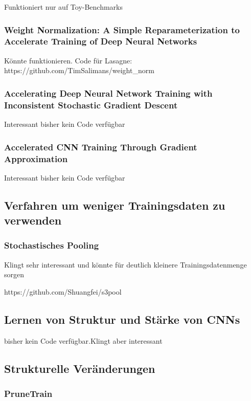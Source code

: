 Funktioniert nur auf Toy-Benchmarks


\subsubsection{Weight Normalization: A Simple Reparameterization
to Accelerate Training of Deep Neural Networks}


Könnte funktionieren. Code für Lasagne: https://github.com/TimSalimans/weight\_norm


\subsubsection{Accelerating Deep Neural Network Training with Inconsistent Stochastic Gradient Descent}

Interessant bisher kein Code verfügbar


\subsubsection{Accelerated CNN Training Through Gradient Approximation }

Interessant bisher kein Code verfügbar




\subsection{Verfahren um weniger Trainingsdaten zu verwenden}


\subsubsection{Stochastisches Pooling}

Klingt sehr interessant und könnte für deutlich kleinere Trainingsdatenmenge sorgen

https://github.com/Shuangfei/s3pool


\subsection{Lernen von Struktur und Stärke von CNNs}

bisher kein Code verfügbar.Klingt aber interessant


\subsection{Strukturelle Veränderungen}


\subsubsection{PruneTrain}

